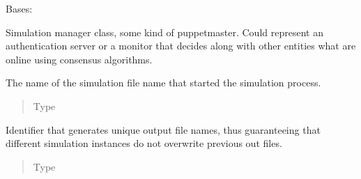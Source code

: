 \documentclass[letterpaper,10pt,english]{sphinxmanual}
\begin{document}

\begin{fulllineitems}
\label{\detokenize{app.domain:app.domain.master_servers.Master}}
Bases: 

Simulation manager class, some kind of puppet\sphinxhyphen{}master. Could represent
an authentication server or a monitor that decides along with other
 entities what {\hyperref[\detokenize{app.domain:app.domain.network_nodes.Node}]{}} are online using consensus algorithms.

\begin{fulllineitems}
\label{\detokenize{app.domain:app.domain.master_servers.Master.origin}}
The name of the simulation file name that started the simulation
process.
\begin{quote}\begin{description}
\item[{Type}] \leavevmode
{}

\end{description}\end{quote}

\end{fulllineitems}


\begin{fulllineitems}
\label{\detokenize{app.domain:app.domain.master_servers.Master.sid}}
Identifier that generates unique output file names,
thus guaranteeing that different simulation instances do not
overwrite previous out files.
\begin{quote}\begin{description}
\item[{Type}] \leavevmode
{}


\end{description}
\end{quote}
\end{fulllineitems}
\end{fulllineitems}
\end{document}
